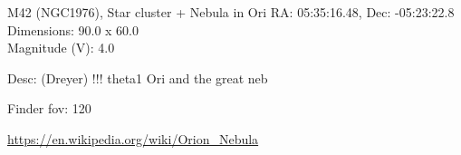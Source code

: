 \begin{block}{M42 (NGC1976), Star cluster + Nebula in Ori}
    RA: 05:35:16.48, Dec: -05:23:22.8 \\ 
    Dimensions: 90.0 x 60.0 \\ 
    Magnitude (V): 4.0


    Desc: (Dreyer) !!! theta1 Ori and the great neb 

    Finder fov: 120 

    \url{https://en.wikipedia.org/wiki/Orion_Nebula} 
\end{block}